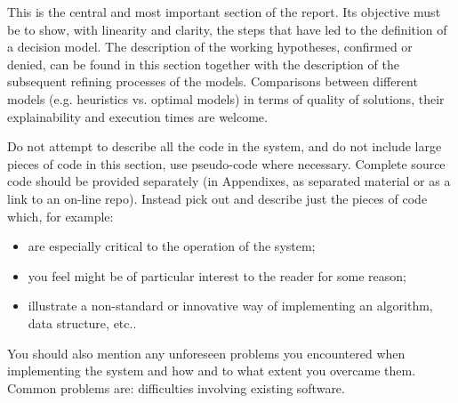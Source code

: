 
This is the central and most important section of the report. Its objective must be to show, with linearity and clarity, the steps that have led to the definition of a decision model. The description of the working hypotheses, confirmed or denied, can be found in this section together with the description of the subsequent refining processes of the models. Comparisons between different models (e.g. heuristics vs. optimal models) in terms of quality of solutions, their explainability and execution times are welcome.

Do not attempt to describe all the code in the system, and do not include large pieces of code in this section, use pseudo-code where necessary. Complete source code should be provided separately (in Appendixes, as separated material or as a link to an on-line repo). Instead pick out and describe just the pieces of code which, for example:

\begin{itemize}
    \item are especially critical to the operation of the system;
    \item you feel might be of particular interest to the reader for some reason;
    \item  illustrate a non-standard or innovative way of implementing an algorithm, data
          structure, etc..
\end{itemize}

You should also mention any unforeseen problems you encountered when implementing the
system and how and to what extent you overcame them. Common problems are:
difficulties involving existing software.

